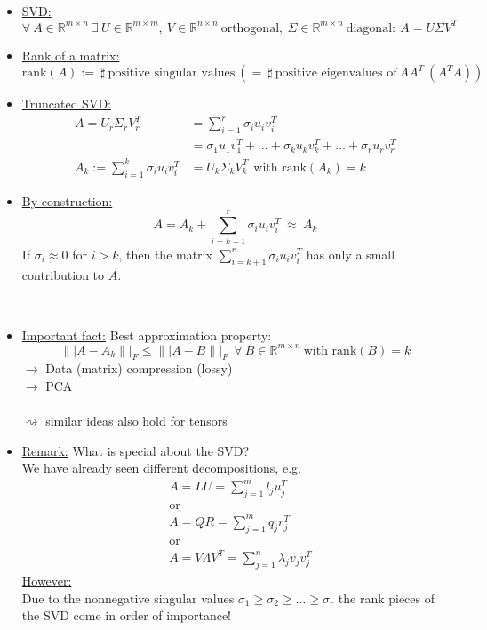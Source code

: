 \begin{frame}
~\\
{\blank
\begin{itemize}\blank
	\item 
	\underline{SVD:}
	$$
	\forall~A\in\mathbb{R}^{m\times n}~\exists~U\in\mathbb{R}^{m\times m},~V\in\mathbb{R}^{n\times n}~\text{orthogonal},~\Sigma\in\mathbb{R}^{m\times n}~\text{diagonal}:~A=U\Sigma V^T
	$$
	\item
	\underline{Rank of a matrix:}
	$$
	\text{rank}(A):=~\sharp~\text{positive singular values}~(=~\sharp~\text{positive eigenvalues of}~AA^T~(A^TA))
	$$
	\item
	\underline{Truncated SVD:}
	\begin{align*}
	A=U_r\Sigma_rV_r^T&=\sum_{i=1}^r \sigma_iu_iv_i^T\\
	&=\sigma_1u_1v_1^T+\dots+\sigma_ku_kv_k^T+\dots+\sigma_ru_rv_r^T\\
	A_k:=\sum_{i=1}^k \sigma_iu_iv_i^T&=U_k\Sigma_k V_k^T~~\text{with rank}(A_k)=k
	\end{align*}
	\item
	\underline{By construction:}
	$$
	A=A_k+\sum_{i=k+1}^r \sigma_iu_iv_i^T~\approx~A_k
	$$
	If $\sigma_i\approx 0$ for $i>k$, then the matrix $\sum_{i=k+1}^r \sigma_iu_iv_i^T$ has only a small contribution to $A$.
\end{itemize}
}
\end{frame}

\begin{frame}
~\\
{\blank
\begin{itemize}\blank
	\item 
	\underline{Important fact:} Best approximation property:
	$$
	\||A-A_k\||_F\leq \||A-B\||_F~~\forall~B\in\mathbb{R}^{m\times n}~\text{with rank}(B)=k
	$$
	$\rightarrow$ Data (matrix) compression (lossy)\\
	$\rightarrow$ PCA\\~\\
	$\rightsquigarrow$ similar ideas also hold for tensors
	\item
	\underline{Remark:} What is special about the SVD?\\
	We have already seen different decompositions, e.g.
	\begin{align*}
	&A=LU=\sum_{j=1}^m l_ju_j^T\\
	&\text{or}\\
	&A=QR=\sum_{j=1}^m q_jr_j^T\\
	&\text{or}\\
	&A=V\Lambda V^T=\sum_{j=1}^n \lambda_jv_jv_j^T
	\end{align*}
	\underline{However:}\\
	Due to the nonnegative singular values $\sigma_1\geq\sigma_2\geq\dots\geq\sigma_r$ the rank pieces of the SVD come in order of importance!
\end{itemize}
}
\end{frame}
